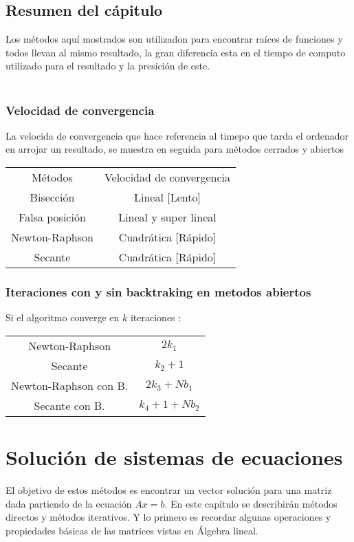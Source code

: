 \section*{Resumen del c\'apitulo}
Los m\'etodos aqu\'i mostrados son utilizadon para encontrar ra\'ices de funciones y todos llevan al mismo resultado, la gran diferencia esta en el tiempo de computo utilizado para el resultado y la presici\'on de este.\\
\\
\subsection*{Velocidad de convergencia}
La velocida de convergencia que hace referencia al timepo que tarda el ordenador en arrojar un resultado, se muestra en seguida para m\'etodos cerrados y abiertos 
\\
\begin{center}
\begin{tabular}{	c		c	}
M\'etodos & Velocidad de convergencia \\
Bisecci\'on & Lineal [Lento] \\
Falsa posici\'on & Lineal y super lineal \\
Newton-Raphson & Cuadr\'atica [R\'apido] \\
Secante & Cuadr\'atica [R\'apido] \\
\end{tabular}
\end{center}

\subsection*{Iteraciones con y sin backtraking en metodos abiertos}
Si el algoritmo converge en $k$ iteraciones :
\begin{center}
\begin{tabular}{	c		c	}
Newton-Raphson & $2k_1$ \\
Secante & $k_2+1$ \\
Newton-Raphson con B. & $2k_3+Nb_1$ \\
Secante con B. & $k_4+1+Nb_2$
\end{tabular}
\end{center}

\chapter{Soluci\'on de sistemas de ecuaciones}
El objetivo de estos m\'etodos es encontrar un vector soluci\'on para una matriz dada partiendo de la ecuaci\'on $Ax=b$. En este cap\'itulo se describir\'an m\'etodos directos y m\'etodos iterativos. Y lo primero es recordar algunas operaciones y propiedades b\'asicas de las matrices vistas en \'Algebra lineal. 

